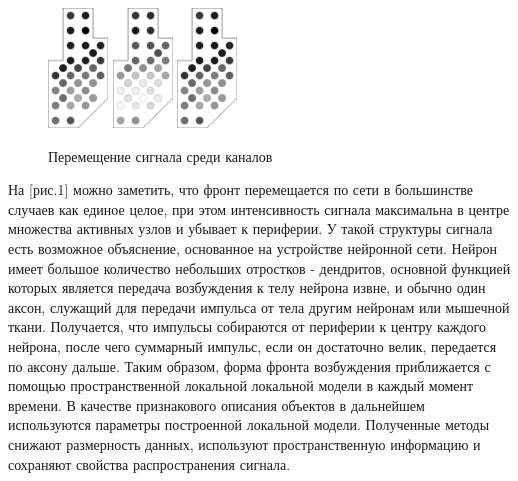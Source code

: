 \documentclass{mipt-thesis-bs}
\begin{document}
\begin{figure}[h]
\begin{center}
	\includegraphics[width=45pt,height=\textheight,keepaspectratio]{imgs/wave0.pdf}
	\includegraphics[width=45pt,height=\textheight,keepaspectratio]{imgs/wave1.pdf}
	\includegraphics[width=45pt,height=\textheight,keepaspectratio]{imgs/wave0.pdf}
	\caption{Перемещение сигнала среди каналов}	
	\label{fig:waves}
	\end{center}
\end{figure}

На [рис.1] можно заметить, что фронт перемещается по сети в большинстве случаев как единое целое, при этом интенсивность сигнала максимальна в центре множества активных узлов и убывает к периферии. У такой структуры сигнала есть возможное объяснение, основанное на устройстве нейронной сети. Нейрон имеет большое количество небольших отростков - дендритов, основной функцией которых является передача возбуждения к телу нейрона извне, и обычно один аксон, служащий для передачи импульса от тела другим нейронам или мышечной ткани. Получается, что импульсы собираются от периферии к центру каждого нейрона, после чего суммарный импульс, если он достаточно велик, передается по аксону дальше. Таким образом, форма фронта возбуждения приближается с помощью пространственной локальной локальной модели в каждый момент времени. В качестве признакового описания объектов в дальнейшем используются параметры построенной локальной модели.
Полученные  методы снижают размерность данных, используют пространственную информацию и сохраняют свойства распространения сигнала.
\end{document}
